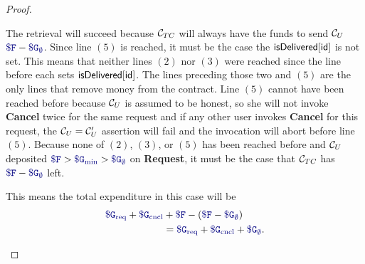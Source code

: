\begin{proof}
\begin{itemize}
The retrieval will succeed because ${\cal C}_{TC}$ will always have the funds to send ${\cal C}_U$ $\consthonestfee - \constgascancel$.
Since line $(5)$ is reached, it must be the case the ${\sf isDelivered}[{\sf id}]$ is not set.
This means that neither lines $(2)$ nor $(3)$ were reached since the line before each sets ${\sf isDelivered}[{\sf id}]$.
The lines preceding those two and $(5)$ are the only lines that remove money from the contract.
Line $(5)$ cannot have been reached before because ${\cal C}_U$ is assumed to be honest, so she will not invoke {\bf Cancel} twice for the same request
and if any other user invokes {\bf Cancel} for this request, the ${\cal C}_U = {\cal C}_U'$ assertion will fail and the invocation will abort before line $(5)$.
Because none of $(2)$, $(3)$, or $(5)$ has been reached before and ${\cal C}_U$ deposited $\consthonestfee > \constgasmin > \constgascancel$ on {\bf Request},
it must be the case that ${\cal C}_{TC}$ has $\consthonestfee - \constgascancel$ left.

This means the total expenditure in this case will be
\begin{align*}
  \constgasrequest + \constgasinvokecancel & + \consthonestfee - (\consthonestfee - \constgascancel) \\
                                           & = \constgasrequest + \constgasinvokecancel + \constgascancel.
\end{align*}
\end{itemize}
\end{proof}

